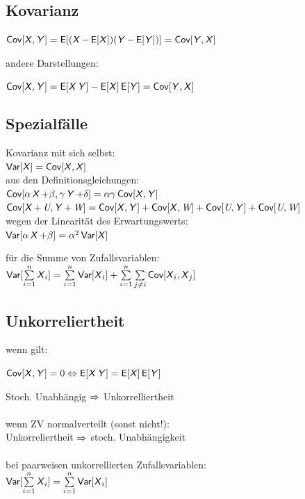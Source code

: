 \documentclass[german,color,6pt]{latex4ei/latex4ei_sheet}
\DeclareMathOperator{\U}{\textit{U}}				%
\DeclareMathOperator{\V}{\textit{W}}				%
\begin{document}
\begin{sectionbox}
	\subsection{Kovarianz}
	
	\begin{emphbox}
		{$\Cov [\X,\Y] = \E[(\X- \E[\X])(\Y - \E[\Y])] = \Cov [\Y, \X]$}
	\end{emphbox}
	
	andere Darstellungen:
	
	$\Cov [\X,\Y] = \E [\X\Y] - \E[\X] \E[\Y] = \Cov[\Y, \X]$
\end{sectionbox}

\begin{sectionbox}
	\subsection{Spezialfälle}
	Kovarianz mit sich selbst:  \\
	$\Var [\X] = \Cov [\X,\X]$ \\
	
	aus den Definitionsgleichungen: \\
	$\Cov [\alpha \X + \beta, \gamma \Y + \delta] = \alpha \gamma \Cov [\X, \Y]$ \\
	$\Cov [ \X + \U, \Y + \V] = \Cov [\X, \Y] + \Cov [\X, \V] + \Cov [\U, \Y] + \Cov [\U, \V]$ \\
	
	wegen der Linearität des Erwartungswerts: \\
	$\Var [ \alpha \X + \beta] = \alpha^2 \Var [\X]$
	
	für die Summe von Zufallsvariablen:  \\
	$\Var [\sum \limits_{i=1}^n \X_i] = \sum \limits_{i=1}^{n} \Var [\X_i] + \sum \limits_{i=1}^{n} \sum \limits_{j \not= i} \Cov [\X_i, 	\X_j]$ \\
\end{sectionbox}

\begin{sectionbox}
	\subsection{Unkorreliertheit}
	wenn gilt:
	\begin{emphbox}
		$\Cov [\X,\Y] = 0 \Leftrightarrow \E[\X\Y] = \E[\X] \E[\Y]$
	\end{emphbox}
	Stoch. Unabhängig $\Ra$ Unkorrelliertheit \\\\
	wenn ZV normalverteilt (sonst nicht!):\\
	Unkorreliertheit $\Ra$ stoch. Unabhängigkeit\\\\
	bei paarweisen unkorrellierten Zufallsvariablen:\\
	$\Var[\sum \limits_{i=1}^{n} \X_i] = \sum \limits_{i=1}^{n} \Var [\X_i]$
\end{sectionbox}
\end{document}
